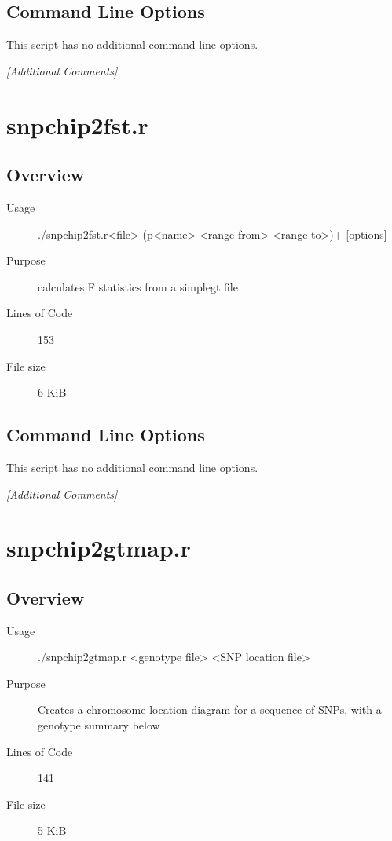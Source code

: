 \subsection{Command Line Options}
\label{sec:snpblaster.r-command-line}

This script has no additional command line options.

\emph{[Additional Comments]}

\section{snpchip2fst.r}
\label{sec:snpchip2fst.r}

\subsection{Overview}
\label{sec:snpchip2fst.r-overview}

\begin{description}
\item[Usage] ./snpchip2fst.r<file> (p<name> <range from> <range to>)+ [options]
\item[Purpose] calculates F statistics from a simplegt file
\item[Lines of Code] 153
\item[File size] 6 KiB
\end{description}

\subsection{Command Line Options}
\label{sec:snpchip2fst.r-command-line}

This script has no additional command line options.

\emph{[Additional Comments]}

\section{snpchip2gtmap.r}
\label{sec:snpchip2gtmap.r}

\subsection{Overview}
\label{sec:snpchip2gtmap.r-overview}

\begin{description}
\item[Usage] ./snpchip2gtmap.r <genotype file> <SNP location file>
\item[Purpose] Creates a chromosome location diagram for a sequence of SNPs, with a genotype summary below
\item[Lines of Code] 141
\item[File size] 5 KiB
\end{description}

